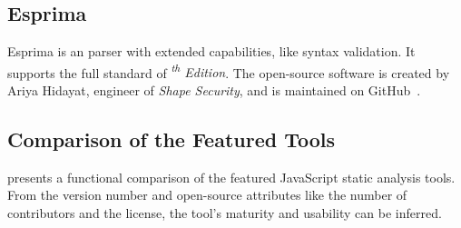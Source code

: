 \subsection{Esprima}

Esprima is an \es parser with extended capabilities, like syntax validation. It supports the full standard of \emph{\textsuperscript{th} Edition}. The open-source software is created by Ariya Hidayat, engineer of \emph{Shape Security}, and is maintained on GitHub~\cite{esprima-github}.


\subsection{Comparison of the Featured Tools}

 presents a functional comparison of the featured JavaScript static analysis tools. From the version number and open-source attributes like the number of contributors and the license, the tool's maturity and usability can be inferred.


